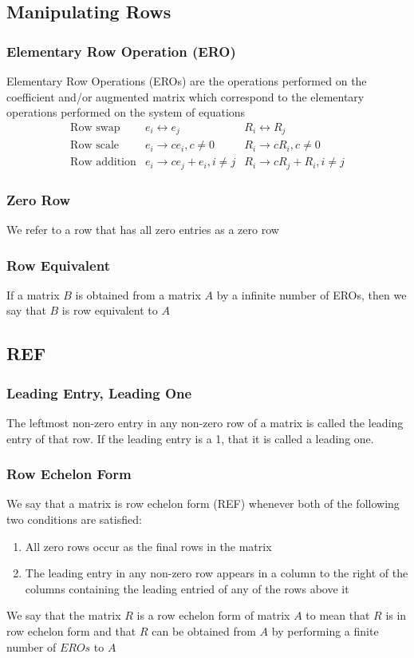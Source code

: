\documentclass[12pt, letterpaper]{article}
\begin{document}
\subsection{Manipulating Rows}
\subsubsection{Elementary Row Operation (ERO)}
Elementary Row Operations (EROs) are the operations performed on the coefficient and/or augmented matrix 
which correspond to the elementary operations performed on the system of equations 
\[\begin{array}{c|c|c}
    \text{Row swap}        & e_i \leftrightarrow e_j           & R_i \leftrightarrow R_j \\
    \text{Row scale}       & e_i \rightarrow ce_i, c\neq 0     & R_i \rightarrow cR_i, c\neq 0 \\
    \text{Row addition}    & e_i \rightarrow ce_j+e_i, i\neq j & R_i \rightarrow cR_j+R_i, i\neq j
\end{array}\]
\subsubsection{Zero Row}
We refer to a row that has all zero entries as a zero row 
\subsubsection{Row Equivalent}
If a matrix $B$ is obtained from a matrix $A$ by a infinite number of EROs, then we 
say that $B$ is row equivalent to $A$
\subsection{REF}
\subsubsection{Leading Entry, Leading One}
The leftmost non-zero entry in any non-zero row of a matrix is called the leading entry of that row. If the 
leading entry is a 1, that it is called a leading one.
\subsubsection{Row Echelon Form}
We say that a matrix is row echelon form (REF) whenever both of the following two conditions are satisfied: 
\begin{enumerate}
    \item All zero rows occur as the final rows in the matrix 
    \item The leading entry in any non-zero row appears in a column to the right of the columns containing the leading entried of any of the rows above it 
\end{enumerate}
We say that the matrix $R$ is a row echelon form of matrix $A$ to mean that $R$ is in row echelon 
form and that $R$ can be obtained from $A$ by performing a finite number of $EROs$ to $A$
\end{document}
